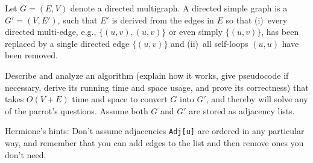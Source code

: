 \documentclass[12pt]{article}
\begin{document}
\begin{enumerate}
Let $G=(E,V)$ denote a directed multigraph. A directed simple graph is a
$G'=(V,E')$, such that $E'$ is derived from the edges in $E$ so that (i)~every
directed multi-edge, e.g., $\{(u,v),(u,v)\}$ or even simply $\{(u,v)\}$, has
been replaced by a single directed edge $\{(u,v)\}$ and (ii)~all self-loops
$(u,u)$ have been removed.\\
\pagebreak

Describe and analyze an algorithm (explain how it works, give pseudocode if
necessary, derive its running time and space usage, and prove its correctness)
that takes \mbox{$O(V+E)$} time and space to convert $G$ into $G'$, and thereby
will solve any of the parrot's questions. Assume both $G$ and $G'$ are stored
as adjacency lists.
	
Hermione's hints: Don't assume adjacencies {\tt Adj[u]} are ordered in any
particular way, and remember that you can add edges to the list and then remove
ones you don't need.\\
\pagebreak

\end{enumerate}
\end{document}
